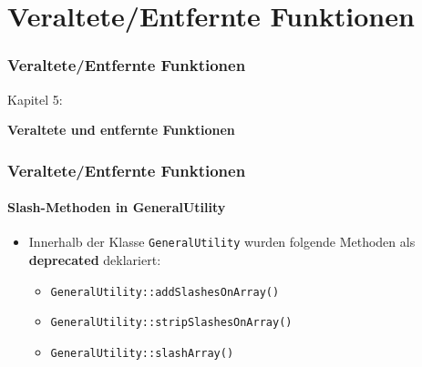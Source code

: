 %

\section{Veraltete/Entfernte Funktionen}
\begin{frame}[fragile]
	\frametitle{Veraltete/Entfernte Funktionen}

	\begin{center}\huge{Kapitel 5:}\end{center}
	\begin{center}\huge{\color{typo3darkgrey}\textbf{Veraltete und entfernte Funktionen}}\end{center}

\end{frame}


\begin{frame}[fragile]
	\frametitle{Veraltete/Entfernte Funktionen}
	\framesubtitle{Slash-Methoden in GeneralUtility}

	\begin{itemize}

		\item Innerhalb der Klasse \texttt{GeneralUtility} wurden folgende Methoden als
			\textbf{deprecated} deklariert:

			\begin{itemize}
				\item \texttt{GeneralUtility::addSlashesOnArray()}
				\item \texttt{GeneralUtility::stripSlashesOnArray()}
				\item \texttt{GeneralUtility::slashArray()}
			\end{itemize}

	\end{itemize}

\end{frame}


